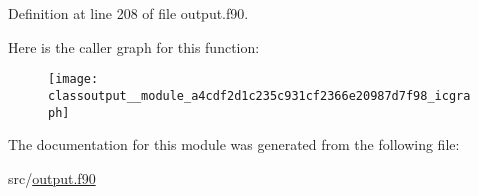 Definition at line 208 of file output.\-f90.



Here is the caller graph for this function\-:\nopagebreak
\begin{figure}[H]
\begin{center}
\leavevmode
\texttt{[image: classoutput\_\_module\_a4cdf2d1c235c931cf2366e20987d7f98\_icgraph]}
\end{center}
\end{figure}




The documentation for this module was generated from the following file\-:\begin{DoxyCompactItemize}
\item 
src/\hyperlink{output_8f90}{output.\-f90}\end{DoxyCompactItemize}
